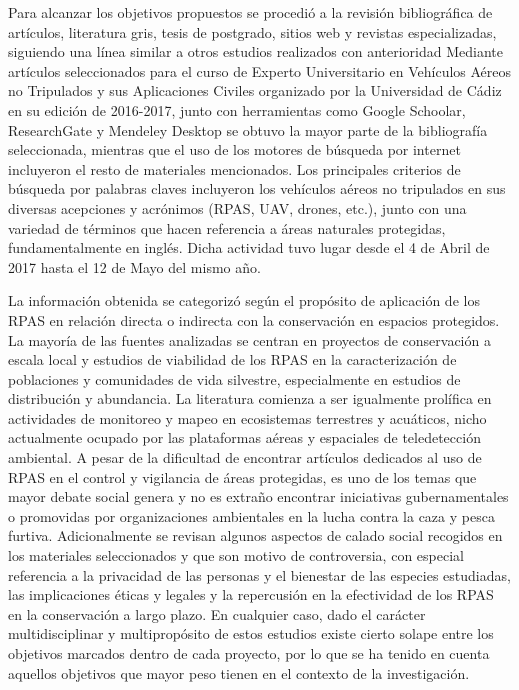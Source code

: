 \documentclass[twocolumn]{extarticle}
\begin{document}
Para alcanzar los objetivos propuestos se procedió a la revisión
bibliográfica de artículos, literatura gris, tesis de postgrado, sitios
web y revistas especializadas, siguiendo una línea similar a otros
estudios realizados con anterioridad
\citep[\citet{Christie2016}]{Linchant2015} Mediante artículos
seleccionados para el curso de Experto Universitario en Vehículos Aéreos
no Tripulados y sus Aplicaciones Civiles organizado por la Universidad
de Cádiz en su edición de 2016-2017, junto con herramientas como Google
Schoolar, ResearchGate y Mendeley Desktop se obtuvo la mayor parte de la
bibliografía seleccionada, mientras que el uso de los motores de
búsqueda por internet incluyeron el resto de materiales mencionados. Los
principales criterios de búsqueda por palabras claves incluyeron los
vehículos aéreos no tripulados en sus diversas acepciones y acrónimos
(RPAS, UAV, drones, etc.), junto con una variedad de términos que hacen
referencia a áreas naturales protegidas, fundamentalmente en inglés.
Dicha actividad tuvo lugar desde el 4 de Abril de 2017 hasta el 12 de
Mayo del mismo año.

La información obtenida se categorizó según el propósito de aplicación
de los RPAS en relación directa o indirecta con la conservación en
espacios protegidos. La mayoría de las fuentes analizadas se centran en
proyectos de conservación a escala local y estudios de viabilidad de los
RPAS en la caracterización de poblaciones y comunidades de vida
silvestre, especialmente en estudios de distribución y abundancia. La
literatura comienza a ser igualmente prolífica en actividades de
monitoreo y mapeo en ecosistemas terrestres y acuáticos, nicho
actualmente ocupado por las plataformas aéreas y espaciales de
teledetección ambiental. A pesar de la dificultad de encontrar artículos
dedicados al uso de RPAS en el control y vigilancia de áreas protegidas,
es uno de los temas que mayor debate social genera y no es extraño
encontrar iniciativas gubernamentales o promovidas por organizaciones
ambientales en la lucha contra la caza y pesca furtiva. Adicionalmente
se revisan algunos aspectos de calado social recogidos en los materiales
seleccionados y que son motivo de controversia, con especial referencia
a la privacidad de las personas y el bienestar de las especies
estudiadas, las implicaciones éticas y legales y la repercusión en la
efectividad de los RPAS en la conservación a largo plazo. En cualquier
caso, dado el carácter multidisciplinar y multipropósito de estos
estudios existe cierto solape entre los objetivos marcados dentro de
cada proyecto, por lo que se ha tenido en cuenta aquellos objetivos que
mayor peso tienen en el contexto de la investigación.
\end{document}
